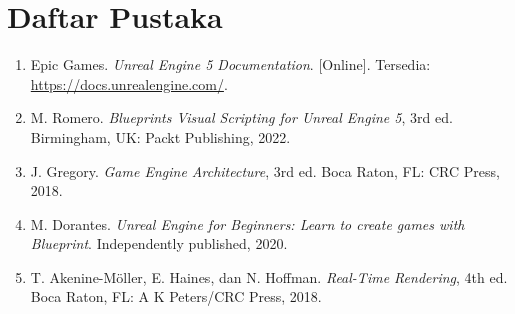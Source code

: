 \chapter{Daftar Pustaka}

\begin{enumerate}
    \item \label{epic} Epic Games. \textit{Unreal Engine 5 Documentation}. [Online]. Tersedia: \url{https://docs.unrealengine.com/}.
    
    \item \label{romero} M. Romero. \textit{Blueprints Visual Scripting for Unreal Engine 5}, 3rd ed. Birmingham, UK: Packt Publishing, 2022.
    
    \item \label{gregory} J. Gregory. \textit{Game Engine Architecture}, 3rd ed. Boca Raton, FL: CRC Press, 2018.
    
    \item \label{dorantes} M. Dorantes. \textit{Unreal Engine for Beginners: Learn to create games with Blueprint}. Independently published, 2020.
    
    \item \label{akenine} T. Akenine-Möller, E. Haines, dan N. Hoffman. \textit{Real-Time Rendering}, 4th ed. Boca Raton, FL: A K Peters/CRC Press, 2018.
\end{enumerate}